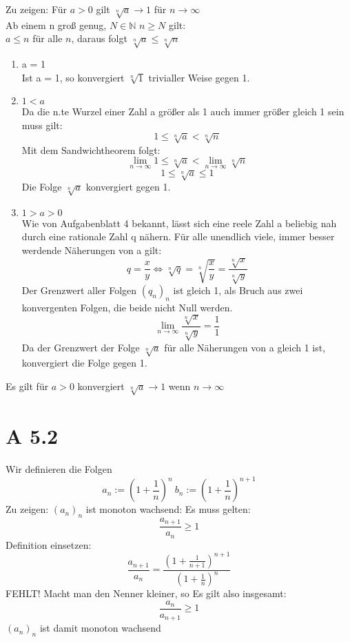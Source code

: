 \documentclass{article}
\begin{document}
    Zu zeigen: Für \(a > 0\) gilt \(\sqrt[n]{a} \to 1\) für \(n \to \infty\) \\
    Ab einem n groß genug, \(N \in \mathbb{N}\) \(n \geq N\) gilt: \\
    \(a \leq n\) für alle \(n\), daraus folgt \(\sqrt[n]{a} \leq \sqrt[n]{n}\) \\
    \begin{enumerate}[ label = \arabic*. Fall ]
        \item a = 1 \\
        Ist a = 1, so konvergiert \(\sqrt[n]{1}\) trivialler Weise gegen 1.
        
        \item \(1 < a\) \\
        Da die n.te Wurzel einer Zahl a größer als 1 auch immer größer gleich 1 sein muss gilt:
        \[1 \leq \sqrt[n]{a} < \sqrt[n]{n} \]
        Mit dem Sandwichtheorem folgt:
        \[\lim_{n \to \infty} 1 \leq \sqrt[n]{a} < \lim_{n \to \infty} \sqrt[n]{n} \]
        \[1 \leq \sqrt[n]{a} \leq 1\]
        Die Folge \(\sqrt[n]{a}\) konvergiert gegen 1.

        \item \(1 > a > 0 \) \\
        Wie von Aufgabenblatt 4 bekannt, lässt sich eine reele Zahl a beliebig nah durch eine rationale Zahl q nähern.
        Für alle unendlich viele, immer besser werdende Näherungen von a gilt:
        \[q = \frac{x}{y} \Leftrightarrow \sqrt[n]{q} = \sqrt[n]{\frac{x}{y}} = \frac{\sqrt[n]{x}}{\sqrt[n]{y}}\]
        Der Grenzwert aller Folgen \({(q_n)_n}\) ist gleich 1, als Bruch aus zwei konvergenten Folgen, die beide nicht Null werden.
        \[\lim_{n \to \infty} \frac{\sqrt[n]{x}}{\sqrt[n]{y}} = \frac{1}{1} \]
        Da der Grenzwert der Folge \(\sqrt[n]{a}\) für alle Näherungen von a gleich 1 ist, konvergiert die Folge gegen 1.
    \end{enumerate}

    Es gilt für \(a > 0\) konvergiert \(\sqrt[n]{a} \to 1\) wenn \(n \to \infty\) \\

    \section*{A 5.2}
    Wir definieren die Folgen
    \[ a_n := { \left( 1 + \frac{1}{n} \right) }^n \ b_n := { \left( 1 + \frac{1}{n} \right) }^{n+1} \]
    Zu zeigen: \( {(a_n)}_n \) ist monoton wachsend:
    Es muss gelten:
    \[ \frac{ a_{n+1} }{ a_n } \geq 1 \]
    Definition einsetzen:
    \[ \frac{ a_{n+1} }{ a_n  }  = \frac{ { \left( 1 + \frac{1}{ n+1 } \right) }^{ n+1 } }{ { \left( 1 + \frac{1}{n} \right) }^n } \]
    FEHLT!
    Macht man den Nenner kleiner, so 
    Es gilt also insgesamt:
    \[
        \frac{ a_n }{ a_{n+1} }  \geq 1
    \]
    \( {(a_n)}_n \) ist damit monoton wachsend \\
\end{document}
